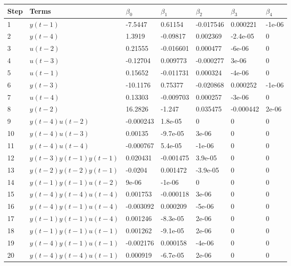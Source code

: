 \begin{tabular}{lllllll}
Step & Terms & $\beta_{0}$ & $\beta_{1}$ & $\beta_{2}$ & $\beta_{3}$ & $\beta_{4}$ \\ 
\hline 
1 & $y(t-1)$ & -7.5447 & 0.61154 & -0.017546 & 0.000221 & -1e-06 \\ 
2 & $y(t-4)$ & 1.3919 & -0.09817 & 0.002369 & -2.4e-05 & 0 \\ 
3 & $u(t-2)$ & 0.21555 & -0.016601 & 0.000477 & -6e-06 & 0 \\ 
4 & $u(t-3)$ & -0.12704 & 0.009773 & -0.000277 & 3e-06 & 0 \\ 
5 & $u(t-1)$ & 0.15652 & -0.011731 & 0.000324 & -4e-06 & 0 \\ 
6 & $y(t-3)$ & -10.1176 & 0.75377 & -0.020868 & 0.000252 & -1e-06 \\ 
7 & $u(t-4)$ & 0.13303 & -0.009703 & 0.000257 & -3e-06 & 0 \\ 
8 & $y(t-2)$ & 16.2826 & -1.247 & 0.035475 & -0.000442 & 2e-06 \\ 
9 & $y(t-4)u(t-2)$ & -0.000243 & 1.8e-05 & 0 & 0 & 0 \\ 
10 & $y(t-4)u(t-3)$ & 0.00135 & -9.7e-05 & 3e-06 & 0 & 0 \\ 
11 & $y(t-4)u(t-4)$ & -0.000767 & 5.4e-05 & -1e-06 & 0 & 0 \\ 
12 & $y(t-3)y(t-1)y(t-1)$ & 0.020431 & -0.001475 & 3.9e-05 & 0 & 0 \\ 
13 & $y(t-2)y(t-2)y(t-1)$ & -0.0204 & 0.001472 & -3.9e-05 & 0 & 0 \\ 
14 & $y(t-1)y(t-1)u(t-2)$ & 9e-06 & -1e-06 & 0 & 0 & 0 \\ 
15 & $y(t-4)y(t-4)u(t-4)$ & 0.001753 & -0.000118 & 3e-06 & 0 & 0 \\ 
16 & $y(t-4)y(t-1)u(t-4)$ & -0.003092 & 0.000209 & -5e-06 & 0 & 0 \\ 
17 & $y(t-1)y(t-1)u(t-4)$ & 0.001246 & -8.3e-05 & 2e-06 & 0 & 0 \\ 
18 & $y(t-1)y(t-1)u(t-1)$ & 0.001262 & -9.1e-05 & 2e-06 & 0 & 0 \\ 
19 & $y(t-4)y(t-1)u(t-1)$ & -0.002176 & 0.000158 & -4e-06 & 0 & 0 \\ 
20 & $y(t-4)y(t-4)u(t-1)$ & 0.000919 & -6.7e-05 & 2e-06 & 0 & 0 \\ 
\hline 
\end{tabular}